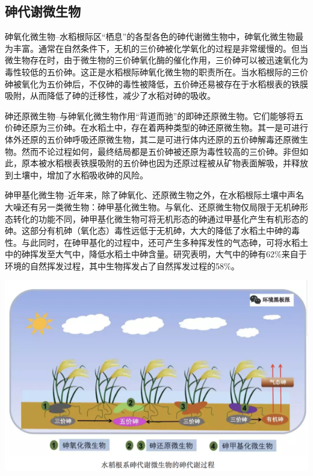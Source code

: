 \documentclass[]{book}
\begin{document}
\hypertarget{ux7837ux4ee3ux8c22ux5faeux751fux7269}{%
\subsection{砷代谢微生物}\label{ux7837ux4ee3ux8c22ux5faeux751fux7269}}

砷氧化微生物--水稻根际区``栖息''的各型各色的砷代谢微生物中，砷氧化微生物最为丰富。通常在自然条件下，无机的三价砷被化学氧化的过程是非常缓慢的。但当微生物存在时，由于微生物的三价砷氧化酶的催化作用，三价砷可以被迅速氧化为毒性较低的五价砷。这正是水稻根际砷氧化微生物的职责所在。当水稻根际的三价砷被氧化为五价砷后，不仅砷的毒性被降低，五价砷还易被存在于水稻根表的铁膜吸附，从而降低了砷的迁移性，减少了水稻对砷的吸收。

砷还原微生物--与砷氧化微生物作用``背道而驰''的即砷还原微生物。它们能够将五价砷还原为三价砷。在水稻土中，存在着两种类型的砷还原微生物。其一是可进行体外还原的五价砷呼吸还原微生物，其二是可进行体内还原的五价砷解毒还原微生物。然而不论过程如何，最终结局都是五价砷被还原为毒性较高的三价砷。非但如此，原本被水稻根表铁膜吸附的五价砷也因为还原过程被从矿物表面解吸，并释放到土壤中，增加了水稻吸收砷的风险。

砷甲基化微生物--近年来，除了砷氧化、还原微生物之外，在水稻根际土壤中声名大噪还有另一类微生物：砷甲基化微生物。与氧化、还原微生物仅局限于无机砷形态转化的功能不同，砷甲基化微生物可将无机形态的砷通过甲基化产生有机形态的砷。这部分有机砷（氧化态）毒性远低于无机砷，大大的降低了水稻土中砷的毒性。与此同时，在砷甲基化的过程中，还可产生多种挥发性的气态砷，可将水稻土中的砷挥发至大气中，降低水稻土中砷含量。研究表明，大气中的砷有62\%来自于环境的自然挥发过程，其中生物挥发占了自然挥发过程的58\%。

\includegraphics[width=8.33in]{images/as4}
\end{document}
